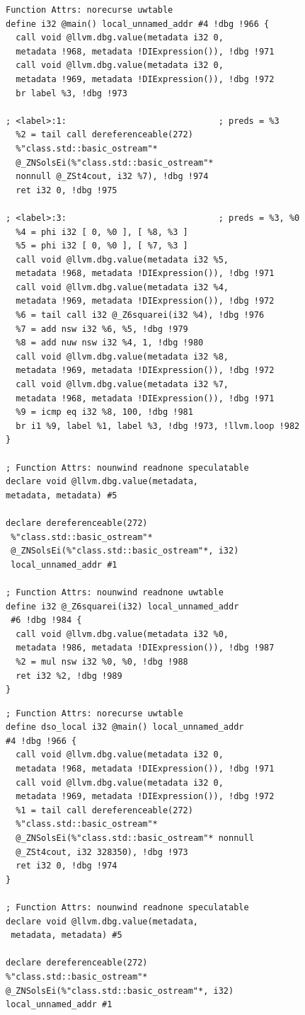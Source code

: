 \documentclass[12pt,oneside]{memoir}
\begin{document}
\begin{lstlisting}[frame=single,caption={Međureprezentacija bez optimizacije celovitog programa }, captionpos=b]
 Function Attrs: norecurse uwtable
define i32 @main() local_unnamed_addr #4 !dbg !966 {
  call void @llvm.dbg.value(metadata i32 0, 
  metadata !968, metadata !DIExpression()), !dbg !971
  call void @llvm.dbg.value(metadata i32 0, 
  metadata !969, metadata !DIExpression()), !dbg !972
  br label %3, !dbg !973

; <label>:1:                              ; preds = %3
  %2 = tail call dereferenceable(272) 
  %"class.std::basic_ostream"* 
  @_ZNSolsEi(%"class.std::basic_ostream"* 
  nonnull @_ZSt4cout, i32 %7), !dbg !974
  ret i32 0, !dbg !975

; <label>:3:                              ; preds = %3, %0
  %4 = phi i32 [ 0, %0 ], [ %8, %3 ]
  %5 = phi i32 [ 0, %0 ], [ %7, %3 ]
  call void @llvm.dbg.value(metadata i32 %5, 
  metadata !968, metadata !DIExpression()), !dbg !971
  call void @llvm.dbg.value(metadata i32 %4, 
  metadata !969, metadata !DIExpression()), !dbg !972
  %6 = tail call i32 @_Z6squarei(i32 %4), !dbg !976
  %7 = add nsw i32 %6, %5, !dbg !979
  %8 = add nuw nsw i32 %4, 1, !dbg !980
  call void @llvm.dbg.value(metadata i32 %8, 
  metadata !969, metadata !DIExpression()), !dbg !972
  call void @llvm.dbg.value(metadata i32 %7, 
  metadata !968, metadata !DIExpression()), !dbg !971
  %9 = icmp eq i32 %8, 100, !dbg !981
  br i1 %9, label %1, label %3, !dbg !973, !llvm.loop !982
}

; Function Attrs: nounwind readnone speculatable
declare void @llvm.dbg.value(metadata, 
metadata, metadata) #5

declare dereferenceable(272)
 %"class.std::basic_ostream"* 
 @_ZNSolsEi(%"class.std::basic_ostream"*, i32) 
 local_unnamed_addr #1

; Function Attrs: nounwind readnone uwtable
define i32 @_Z6squarei(i32) local_unnamed_addr
 #6 !dbg !984 {
  call void @llvm.dbg.value(metadata i32 %0, 
  metadata !986, metadata !DIExpression()), !dbg !987
  %2 = mul nsw i32 %0, %0, !dbg !988
  ret i32 %2, !dbg !989
}
\end{lstlisting}

\begin{lstlisting}[frame=single,caption={Međureprezentacija sa optimizacijom celovitog programa }, captionpos=b]
; Function Attrs: norecurse uwtable
define dso_local i32 @main() local_unnamed_addr 
#4 !dbg !966 {
  call void @llvm.dbg.value(metadata i32 0, 
  metadata !968, metadata !DIExpression()), !dbg !971
  call void @llvm.dbg.value(metadata i32 0, 
  metadata !969, metadata !DIExpression()), !dbg !972
  %1 = tail call dereferenceable(272) 
  %"class.std::basic_ostream"* 
  @_ZNSolsEi(%"class.std::basic_ostream"* nonnull 
  @_ZSt4cout, i32 328350), !dbg !973
  ret i32 0, !dbg !974
}

; Function Attrs: nounwind readnone speculatable
declare void @llvm.dbg.value(metadata,
 metadata, metadata) #5

declare dereferenceable(272) 
%"class.std::basic_ostream"* 
@_ZNSolsEi(%"class.std::basic_ostream"*, i32) 
local_unnamed_addr #1

\end{lstlisting}
\end{document}
